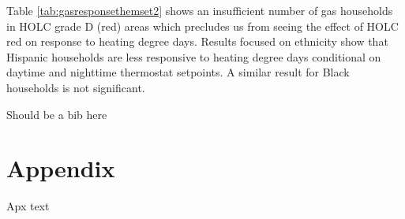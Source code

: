 \documentclass[
]{article}
\begin{document}
Table \ref{tab:gasresponsethemset2} shows an insufficient number of gas households in HOLC grade D (red) areas which precludes us from seeing the effect of HOLC red on response to heating degree days.
Results focused on ethnicity show that Hispanic households are less responsive to heating degree days conditional on daytime and nighttime
thermostat setpoints. A similar result for Black households is not significant.\cite{Reames2016} \cite{Baxter1998}

Should be a bib here
\printbibliography

\hypertarget{refs}{}

\hypertarget{appendix}{%
\section{Appendix}\label{appendix}}

\appendix

Apx text

\printbibliography
\end{document}
